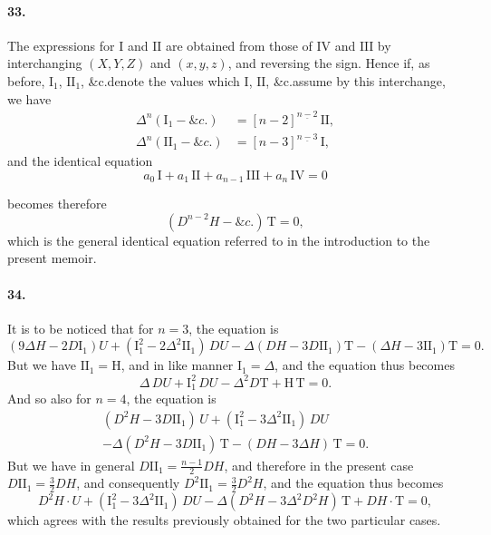 \documentclass[11pt,a4paper]{book}
\begin{document}
\paragraph{33.}
The  expressions  for  $\mathrm{I}$  and  $\mathrm{II}$  are  obtained  from  those  of  $\mathrm{IV}$  and  $\mathrm{III}$  by
interchanging  $(X, Y, Z)$  and  $(x, y, z)$,  and  reversing  the  sign.  Hence  if,  as  before,
$\mathrm{I}_1$, $\mathrm{II}_1$,  \&c.\@  denote  the  values  which  $\mathrm{I}$, $\mathrm{II}$,  \&c.\@  assume  by  this  interchange,  we  have
\begin{align*}
\Delta^n (\mathrm{I}_1 - \&c.) &= [n-2]^{\underline{n-2}} \, \mathrm{II}, \\
\Delta^n (\mathrm{II}_1 - \&c.) &= [n-3]^{\underline{n-3}} \, \mathrm{I},
\end{align*}
and  the  identical  equation
\[
a_0 \, \mathrm{I} + a_1 \, \mathrm{II} + a_{n-1} \, \mathrm{III} + a_n \, \mathrm{IV} = 0
\]

\newpage

becomes  therefore
\[
(D^{n-2} H - \&c.) \, \mathrm{T} = 0,
\]
which  is  the  general    identical   equation  referred  to   in   the  introduction  to  the  present
memoir.

\paragraph{34.}
It  is  to  be  noticed  that  for  $n = 3$,  the  equation  is
\[
(9 \Delta H - 2 D \mathrm{I}_1) U + (\mathrm{I}_1^2 - 2 \Delta^2 \mathrm{II}_1) \, DU - \Delta (DH - 3 D\mathrm{II}_1) \mathrm{T} - (\Delta H - 3 \mathrm{II}_1) \mathrm{T} = 0.
\]
But  we  have  $\mathrm{II}_1 = \mathrm{H}$,  and  in  like  manner  $\mathrm{I}_1 = \Delta$,  and  the  equation  thus  becomes
\[
\Delta \, DU + \mathrm{I}_1^2 \, DU - \Delta^2 D\mathrm{T} + \mathrm{H} \, \mathrm{T} = 0.
\]
And  so  also  for  $n = 4$,  the  equation  is
\begin{multline*}
(D^2 H - 3 D\mathrm{II}_1) \, U + (\mathrm{I}_1^2 - 3 \Delta^2 \mathrm{II}_1) \, DU \\
- \Delta (D^2 H - 3 D\mathrm{II}_1) \, \mathrm{T} - (DH - 3 \Delta H) \, \mathrm{T} = 0.
\end{multline*}
But  we  have  in  general  $D\mathrm{II}_1 = \frac{n-1}{2} DH$,  and  therefore  in  the  present  case  $D\mathrm{II}_1 = \frac{3}{2} DH$,
and   consequently   $D^2 \mathrm{II}_1 = \frac{3}{2} D^2 H$,  and  the  equation  thus  becomes
\[
D^2 H \cdot U + (\mathrm{I}_1^2 - 3 \Delta^2 \mathrm{II}_1) \, DU - \Delta (D^2 H - 3 \Delta^2 D^2 H) \, \mathrm{T} + DH \cdot \mathrm{T} = 0,
\]
which  agrees  with  the  results  previously  obtained  for  the  two  particular  cases.
\end{document}
